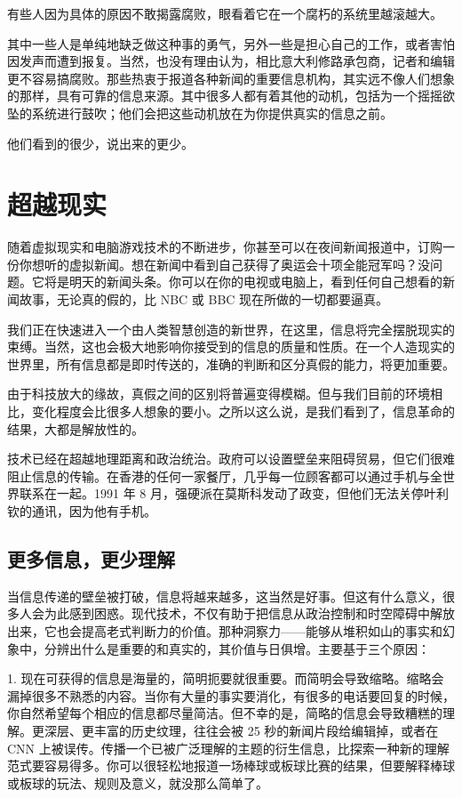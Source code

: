 有些人因为具体的原因不敢揭露腐败，眼看着它在一个腐朽的系统里越滚越大。

其中一些人是单纯地缺乏做这种事的勇气，另外一些是担心自己的工作，或者害怕因发声而遭到报复。当然，也没有理由认为，相比意大利修路承包商，记者和编辑更不容易搞腐败。那些热衷于报道各种新闻的重要信息机构，其实远不像人们想象的那样，具有可靠的信息来源。其中很多人都有着其他的动机，包括为一个摇摇欲坠的系统进行鼓吹；他们会把这些动机放在为你提供真实的信息之前。

他们看到的很少，说出来的更少。

\section{超越现实}
随着虚拟现实和电脑游戏技术的不断进步，你甚至可以在夜间新闻报道中，订购一份你想听的虚拟新闻。想在新闻中看到自己获得了奥运会十项全能冠军吗？没问题。它将是明天的新闻头条。你可以在你的电视或电脑上，看到任何自己想看的新闻故事，无论真的假的，比 NBC 或 BBC 现在所做的一切都要逼真。

我们正在快速进入一个由人类智慧创造的新世界，在这里，信息将完全摆脱现实的束缚。当然，这也会极大地影响你接受到的信息的质量和性质。在一个人造现实的世界里，所有信息都是即时传送的，准确的判断和区分真假的能力，将更加重要。

由于科技放大的缘故，真假之间的区别将普遍变得模糊。但与我们目前的环境相比，变化程度会比很多人想象的要小。之所以这么说，是我们看到了，信息革命的结果，大都是解放性的。

技术已经在超越地理距离和政治统治。政府可以设置壁垒来阻碍贸易，但它们很难阻止信息的传输。在香港的任何一家餐厅，几乎每一位顾客都可以通过手机与全世界联系在一起。1991 年 8 月，强硬派在莫斯科发动了政变，但他们无法关停叶利钦的通讯，因为他有手机。

\subsection{更多信息，更少理解}
当信息传递的壁垒被打破，信息将越来越多，这当然是好事。但这有什么意义，很多人会为此感到困惑。现代技术，不仅有助于把信息从政治控制和时空障碍中解放出来，它也会提高老式判断力的价值。那种洞察力——能够从堆积如山的事实和幻象中，分辨出什么是重要的和真实的，其价值与日俱增。主要基于三个原因：

1. 现在可获得的信息是海量的，简明扼要就很重要。而简明会导致缩略。缩略会漏掉很多不熟悉的内容。当你有大量的事实要消化，有很多的电话要回复的时候，你自然希望每个相应的信息都尽量简洁。但不幸的是，简略的信息会导致糟糕的理解。更深层、更丰富的历史纹理，往往会被 25 秒的新闻片段给编辑掉，或者在 CNN 上被误传。传播一个已被广泛理解的主题的衍生信息，比探索一种新的理解范式要容易得多。你可以很轻松地报道一场棒球或板球比赛的结果，但要解释棒球或板球的玩法、规则及意义，就没那么简单了。

